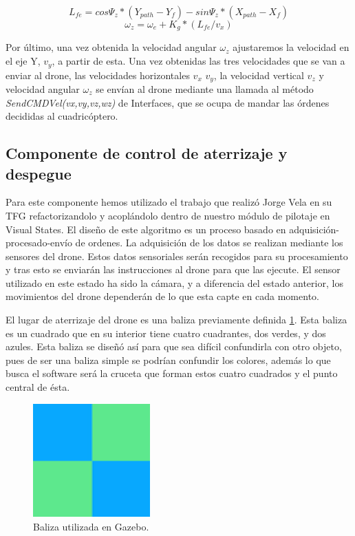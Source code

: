 \[ L_{fe} = cos\Psi_{z}*(Y_{path}-Y_{f}) - sin\Psi_{z}*(X_{path}-X_{f}) \]
\[ \omega_{z} = \omega_{e} + K_{g} * (L_{fe}/v_{x})\]

\hspace{1cm} Por último, una vez obtenida la velocidad angular $\omega_{z}$ ajustaremos la velocidad en el eje Y, $v_{y}$, a partir de esta. Una vez obtenidas las tres velocidades que se van a enviar al drone, las velocidades horizontales $v_{x}$ $v_{y}$, la velocidad vertical $v_{z}$ y velocidad angular $\omega_{z}$ se envían al drone mediante una llamada al método \textit{SendCMDVel(vx,vy,vz,wz)}
de Interfaces, que se ocupa de mandar las órdenes decididas al cuadricóptero.


\subsection{Componente de control de aterrizaje y despegue}
\hspace{1cm} Para este componente hemos utilizado el trabajo que realizó Jorge Vela en su TFG \cite{JorgeVela} refactorizandolo y acoplándolo dentro de nuestro módulo de pilotaje en Visual States. El diseño de este algoritmo es un proceso basado en adquisición-procesado-envío de ordenes.  La adquisición de los datos se realizan mediante los sensores del drone. Estos datos sensoriales serán recogidos para su procesamiento y tras esto se enviarán las instrucciones al drone para que las ejecute. El sensor  utilizado en este estado ha sido la cámara, y a diferencia del estado anterior, los movimientos del drone dependerán de lo que esta capte en cada momento.

\hspace{1cm} El lugar de aterrizaje del drone es una baliza previamente definida \ref{fig:Baliza.}. Esta baliza es un cuadrado que en su interior tiene cuatro cuadrantes, dos verdes, y dos azules. Esta baliza se diseñó así para que sea difícil confundirla con otro objeto, pues de ser una baliza simple se podrían confundir los colores, además lo que busca el software será la cruceta que forman estos cuatro cuadrados y el punto central de ésta.

\begin{figure}[H]
	\begin{center}
		\includegraphics[width=0.4\textwidth]{imag/IMG33.png}
				\caption{Baliza utilizada en Gazebo.}
		\label{fig:Baliza.}	
	\end{center}
\end{figure}

